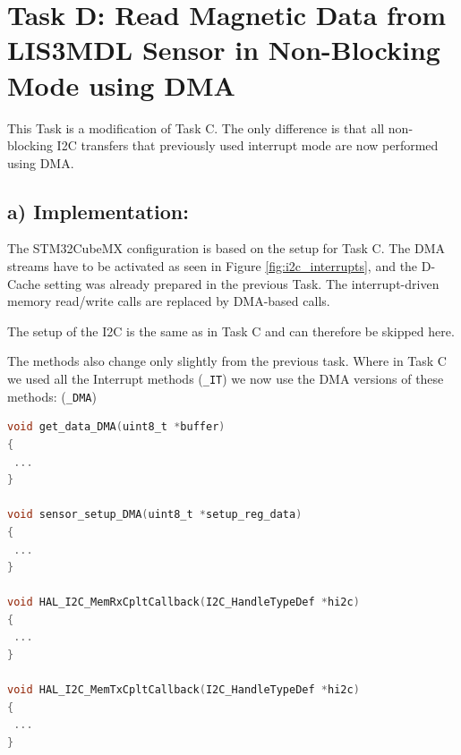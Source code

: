 \section{Task D: Read Magnetic Data from LIS3MDL Sensor in Non-Blocking Mode using DMA}

This Task is a modification of Task C. The only difference is that all non-blocking I2C transfers that previously used interrupt
mode are now performed using DMA.

\subsection{a) Implementation:}

The STM32CubeMX configuration is based on the setup for Task C. The
DMA streams have to be activated as seen in Figure \ref{fig:i2c_interrupts}, and the
D-Cache setting was already prepared in the previous Task.
The interrupt-driven memory read/write calls are replaced by DMA-based
calls.

The setup of the I2C is the same as in Task C and can therefore be skipped here.

The methods also change only slightly from the previous task. Where in Task C we used all the Interrupt methods (\texttt{\_IT}) we now use the DMA versions of these methods: (\texttt{\_DMA}) 

\begin{lstlisting}[language=C, numbers=none, caption={Control registers for the Sensor adapted to fit DMA protocolls}, captionpos=b]
void get_data_DMA(uint8_t *buffer)
{
 ...
}

void sensor_setup_DMA(uint8_t *setup_reg_data)
{
 ...
}

void HAL_I2C_MemRxCpltCallback(I2C_HandleTypeDef *hi2c)
{
 ... 
}

void HAL_I2C_MemTxCpltCallback(I2C_HandleTypeDef *hi2c)
{
 ...
}
\end{lstlisting}


